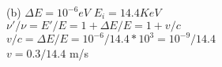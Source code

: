 \documentclass[10pt, a4paper]{article}
\begin{document}
\begin{enumerate}
		(b) \begin{math} \Delta E = 10^{-6} eV \end{math} \begin{math} E_i = 14.4 KeV \end{math}\\
		\begin{math} \nu'/\nu = E'/E = 1+\Delta E/E = 1+v/c\end{math}\\
		\begin{math} v/c = \Delta E/E = 10^{-6}/14.4*10^3 = 10^{-9}/14.4\end{math}\\
		\begin{math} v = 0.3/14.4 \end{math} m/s\\
	\end{enumerate}
\end{document}
